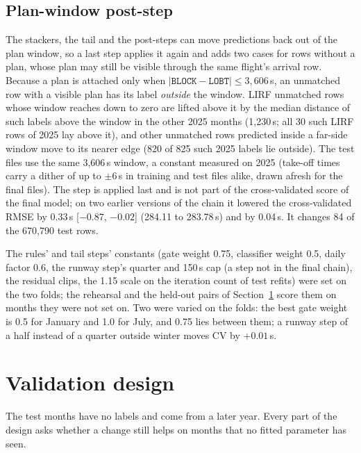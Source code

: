 \documentclass[
  manuscript=article,
  layout=preprint,
  year=2026,
  volume=x,
]{extra/joas}
\newcommand{\fld}[1]{\texttt{#1}}
\begin{document}
\subsection{Plan-window post-step}
\label{sec:postep}

The stackers, the tail and the post-steps can move predictions back out of the plan window, so a last step applies it again and adds two cases for rows
without a plan, whose plan may still be visible through the same flight's arrival row. Because a plan is attached only when
$|\fld{BLOCK} - \fld{LOBT}| \le 3{,}606$\,s, an unmatched row with a visible plan has its label \emph{outside} the window. LIRF unmatched rows
whose window reaches down to zero are lifted above it by the median distance of such labels above the window in the other 2025 months
(1,230\,s; all 30 such LIRF rows of 2025 lay above it), and other unmatched rows predicted inside a far-side window move to its nearer
edge (820 of 825 such 2025 labels lie outside). The test files use the same 3,606\,s window, a constant measured on 2025 (take-off times carry a dither of up to $\pm$6\,s
in training and test files alike, drawn afresh for the final files). The step is applied last and is not part of the cross-validated score of the final model; on two earlier versions of the chain it lowered the cross-validated RMSE by 0.33\,s [$-0.87$, $-0.02$] (284.11 to 283.78\,s) and by 0.04\,s. It changes 84 of the 670,790 test rows.

The rules' and tail steps' constants (gate weight 0.75, classifier weight 0.5, daily factor 0.6, the runway step's quarter and 150\,s cap (a step not in the final chain),
the residual clips, the 1.15 scale on the iteration count of test refits) were set on the two folds; the rehearsal and the held-out pairs
of Section~\ref{sec:validation} score them on months they were not set on. Two were varied on the folds: the best gate weight is 0.5 for
January and 1.0 for July, and 0.75 lies between them; a runway step of a half instead of a quarter outside winter moves CV by $+0.01$\,s.


\section{Validation design}
\label{sec:validation}

The test months have no labels and come from a later year. Every part of the design asks whether a change still helps on months that no
fitted parameter has seen.
\end{document}

